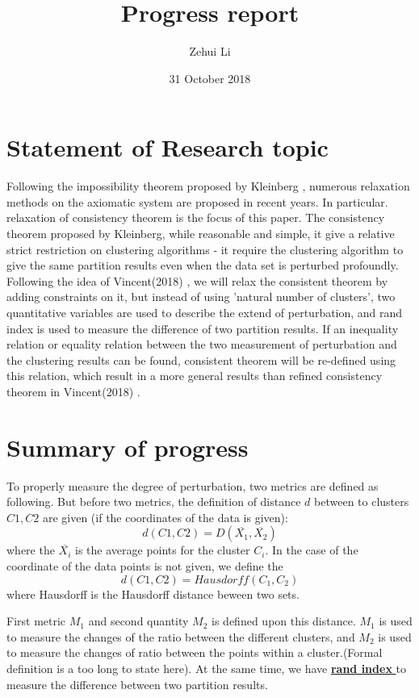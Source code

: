 \documentclass[a4paper,9pt]{article}
\title{Progress report}
\author{Zehui Li}
\date{31 October 2018}
\begin{document}
  \maketitle
	\section*{Statement of Research topic} 
	Following the impossibility theorem proposed by Kleinberg \cite{Kleinberg}, numerous relaxation methods on the axiomatic system are proposed in recent years. In particular. relaxation of consistency theorem is the focus of this paper. The consistency theorem proposed by Kleinberg, while reasonable and simple, it give a relative strict restriction on clustering algorithms - it require the clustering algorithm to give the same partition results even when the data set is perturbed profoundly. Following the idea of Vincent(2018) \cite{Vincent}, we will relax the consistent theorem by adding constraints on it, but instead of using 'natural number of clusters', two quantitative variables are used to describe the extend of perturbation, and rand index is used to measure the difference of two partition results. If an inequality relation or equality relation between the two measurement of perturbation and the clustering results can be found, consistent theorem will be re-defined using this relation, which result in a more general results than refined consistency theorem in Vincent(2018) \cite{Vincent}.
	

	\section*{Summary of progress} 
To properly measure the degree of perturbation, two metrics are defined as following. But before two metrics, the definition of distance $d$ between to clusters $C1, C2$ are given (if the coordinates of the data is given):
\begin{equation}
d(C1,C2) = D(\overline{X_1},\overline{X_2})
\label{myfirstequation}
\end{equation} 
where the $\overline{X_i}$ is the average points for the cluster $C_i$. In the case of the coordinate of the data points is not given, we define the 
\begin{equation}
d(C1,C2) = Hausdorff(C_1,C_2)
\label{mysecond}
\end{equation} 
where Hausdorff is the Hausdorff distance beween two sets.

First metric $M_1$ and second quantity $M_2$ is defined upon this distance. $M_1$ is used to measure the changes of the ratio between the different clusters, and $M_2$ is used to measure the changes of ratio between the points within a cluster.(Formal definition is a too long to state here). At the same time, we have \href{https://en.wikipedia.org/wiki/Rand_index}{\textbf{rand index} }  to measure the difference between two partition results.
\end{document}
